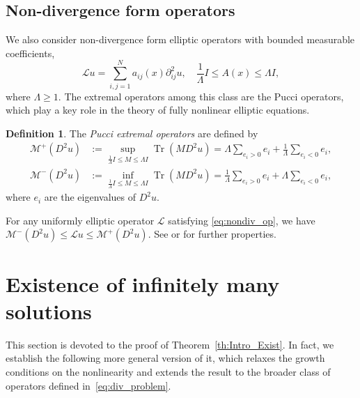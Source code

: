 \documentclass[10pt,twoside,english,reqno,a4paper]{amsart}
\theoremstyle{plain}
\theoremstyle{plain}
\theoremstyle{definition}
\newtheorem{definition}[theorem]{Definition}
\theoremstyle{remark}
\numberwithin{equation}{section}
\begin{document}
\subsection{Non-divergence form operators}
We also consider non-divergence form elliptic operators with bounded measurable coefficients,
\begin{equation}\label{eq:nondiv_op}
    \mathcal{L}u = \sum\limits_{i,j = 1}^Na_{ij}(x)\partial^2_{ij}u, \quad \frac{1}{\Lambda} I \leq A(x) \leq \Lambda I,
\end{equation}
where $\Lambda \geq 1$. The extremal operators among this class are the Pucci operators, which play a key role in the theory of fully nonlinear elliptic equations.
\begin{definition}
The \emph{Pucci extremal operators} are defined by
\begin{align*}
\mathcal{M}^+(D^2u) &:= \sup\limits_{\frac{1}{\Lambda} I \leq M \leq \Lambda I}\operatorname{Tr}(MD^2u) = \Lambda \sum_{e_i > 0} e_i + \frac{1}{\Lambda} \sum_{e_i < 0} e_i, \\
\mathcal{M}^-(D^2u) &:= \inf\limits_{\frac{1}{\Lambda} I \leq M \leq \Lambda I}\operatorname{Tr}(MD^2u) = \frac{1}{\Lambda} \sum_{e_i > 0} e_i + \Lambda \sum_{e_i < 0} e_i,
\end{align*}
where $e_i$ are the eigenvalues of $D^2u$.
\end{definition}

For any uniformly elliptic operator $\mathcal{L}$ satisfying \eqref{eq:nondiv_op}, we have $\mathcal{M}^-(D^2u) \leq \mathcal{L}u \leq \mathcal{M}^+(D^2u)$. See \cite{CC95} or \cite{FR22} for further properties.



\section{Existence of infinitely many solutions}
\label{sec:existence}

This section is devoted to the proof of Theorem~\ref{th:Intro_Exist}. In fact, we establish the following more general version of it, which relaxes the growth conditions on the nonlinearity and extends the result to the broader class of operators defined in~\eqref{eq:div_problem}.
\end{document}

